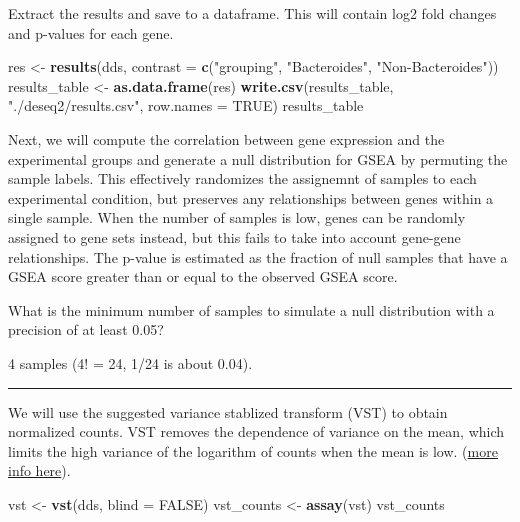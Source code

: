 \documentclass[
]{book}
\newenvironment{Shaded}{\begin{snugshade}}{\end{snugshade}}
\newcommand{\AttributeTok}[1]{\textcolor[rgb]{0.13,0.29,0.53}{#1}}
\newcommand{\ConstantTok}[1]{\textcolor[rgb]{0.56,0.35,0.01}{#1}}
\newcommand{\FunctionTok}[1]{\textcolor[rgb]{0.13,0.29,0.53}{\textbf{#1}}}
\newcommand{\NormalTok}[1]{#1}
\newcommand{\OtherTok}[1]{\textcolor[rgb]{0.56,0.35,0.01}{#1}}
\newcommand{\StringTok}[1]{\textcolor[rgb]{0.31,0.60,0.02}{#1}}
\begin{document}
Extract the results and save to a dataframe. This will contain log2 fold changes and p-values for each gene.

\begin{Shaded}
\begin{Highlighting}[numbers=left,,]
\NormalTok{res }\OtherTok{\textless{}{-}} \FunctionTok{results}\NormalTok{(dds, }\AttributeTok{contrast =} \FunctionTok{c}\NormalTok{(}\StringTok{"grouping"}\NormalTok{, }\StringTok{"Bacteroides"}\NormalTok{, }\StringTok{"Non{-}Bacteroides"}\NormalTok{))}
\NormalTok{results\_table }\OtherTok{\textless{}{-}} \FunctionTok{as.data.frame}\NormalTok{(res)}
\FunctionTok{write.csv}\NormalTok{(results\_table, }\StringTok{"./deseq2/results.csv"}\NormalTok{, }\AttributeTok{row.names =} \ConstantTok{TRUE}\NormalTok{)}
\NormalTok{results\_table}
\end{Highlighting}
\end{Shaded}

Next, we will compute the correlation between gene expression and the experimental groups and generate a null distribution for GSEA
by permuting the sample labels. This effectively randomizes the assignemnt of samples
to each experimental condition, but preserves any relationships between genes within a single sample.
When the number of samples is low, genes can be randomly assigned to gene sets instead, but this fails to take into account gene-gene relationships.
The p-value is estimated as the fraction of null samples that have a GSEA score greater than or equal to the observed GSEA score.

What is the minimum number of samples to simulate a null distribution with a precision of at least 0.05?

4 samples (4! = 24, 1/24 is about 0.04).

\begin{center}\rule{0.5\linewidth}{0.5pt}\end{center}

We will use the suggested variance stablized transform (VST) to obtain normalized counts. VST removes the dependence of variance on the mean,
which limits the high variance of the logarithm of counts when the mean is low.
(\href{https://bioconductor.org/packages/devel/bioc/vignettes/DESeq2/inst/doc/DESeq2.html\#:~:text=transformations\%20and\%20visualization-,Count\%20data\%20transformations,-In\%20order\%20to}{more info here}).

\begin{Shaded}
\begin{Highlighting}[numbers=left,,]
\NormalTok{vst }\OtherTok{\textless{}{-}} \FunctionTok{vst}\NormalTok{(dds, }\AttributeTok{blind =} \ConstantTok{FALSE}\NormalTok{)}
\NormalTok{vst\_counts }\OtherTok{\textless{}{-}} \FunctionTok{assay}\NormalTok{(vst)}
\NormalTok{vst\_counts}
\end{Highlighting}
\end{Shaded}
\end{document}
